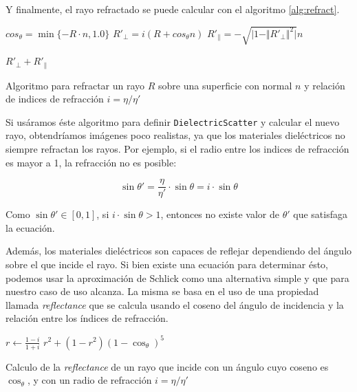 Y finalmente, el rayo refractado se puede calcular con el algoritmo
\ref{alg:refract}.

\begin{algorithm}
\begin{algorithmic}[1]

    \State $cos_{\theta} = \min\{-R \cdot n, 1.0\}$
    \State $R'_{\perp} = i (R + cos_{\theta} n)$
    \State $R'_{\parallel} = - \sqrt{\vert 1 - \Vert R'_{\perp} \Vert ^ 2 \vert} n$

    \State \Return $R'_{\perp} + R'_{\parallel}$
\EndFunction
\end{algorithmic}
\caption{Algoritmo para refractar un rayo $R$ sobre una superficie con normal
$n$ y relación de indices de refracción $i = \eta / \eta'$}
\label{alg:refract}
\end{algorithm}

Si usáramos éste algoritmo para definir \texttt{DielectricScatter} y calcular el
nuevo rayo, obtendríamos imágenes poco realistas, ya que los materiales
dieléctricos no siempre refractan los rayos. Por ejemplo, si el radio entre los
indices de refracción es mayor a 1, la refracción no es posible:

\[
    \sin \theta' = \frac{\eta}{\eta'} \cdot \sin \theta = i \cdot \sin \theta
\]

Como $\sin \theta' \in [0, 1]$, si $i \cdot \sin \theta > 1$, entonces no existe valor
de $\theta'$ que satisfaga la ecuación.

Además, los materiales dieléctricos son capaces de reflejar dependiendo del
ángulo sobre el que incide el rayo. Si bien existe una ecuación para determinar
ésto, podemos usar la aproximación de Schlick \cite{schlicksapprox} como una
alternativa simple y que para nuestro caso de uso alcanza. La misma se basa en
el uso de una propiedad llamada \textit{reflectance} que se calcula usando el
coseno del ángulo de incidencia y la relación entre los índices de refracción.

\begin{algorithm}
\begin{algorithmic}[1]
    \State $r \gets \frac{1 - i}{1 + i}$
    \State \Return $r^2 + (1-r^2) (1 - \cos_{\theta})^5$
\EndFunction
\end{algorithmic}
\caption{Calculo de la \textit{reflectance} de un rayo que incide con un ángulo
cuyo coseno es $\cos_{\theta}$, y con un radio de refracción $i = \eta / \eta'$}
\label{alg:reflectance}
\end{algorithm}

